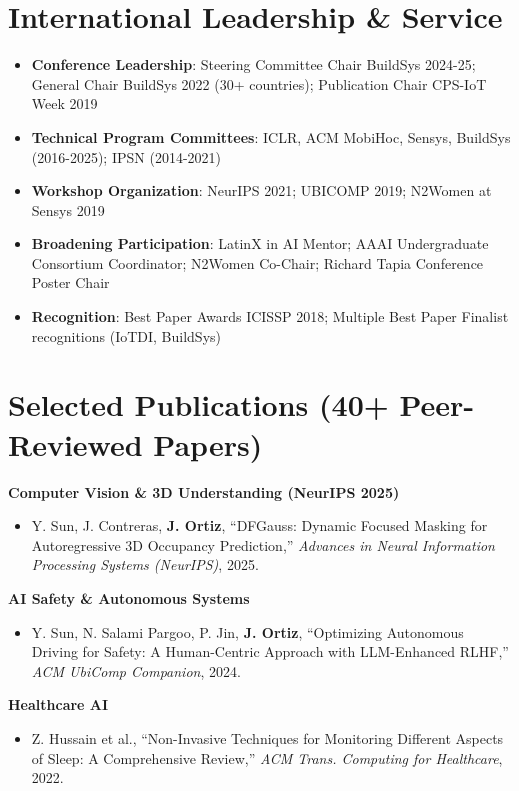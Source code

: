 \documentclass[11pt,letterpaper]{article}
\newcommand{\listentry}[1]{
    \item[\textcolor{accentBlue}{\small\faAngleRight}] #1
}
\begin{document}
\section{International Leadership \& Service}
\begin{itemize}
\listentry{\textbf{\color{UNBlue}Conference Leadership}: Steering Committee Chair BuildSys 2024-25; General Chair BuildSys 2022 (30+ countries); Publication Chair CPS-IoT Week 2019}
\listentry{\textbf{\color{UNBlue}Technical Program Committees}: ICLR, ACM MobiHoc, Sensys, BuildSys (2016-2025); IPSN (2014-2021)}
\listentry{\textbf{\color{UNBlue}Workshop Organization}: NeurIPS 2021; UBICOMP 2019; N2Women at Sensys 2019}
\listentry{\textbf{\color{UNBlue}Broadening Participation}: LatinX in AI Mentor; AAAI Undergraduate Consortium Coordinator; N2Women Co-Chair; Richard Tapia Conference Poster Chair}
\listentry{\textbf{\color{UNBlue}Recognition}: Best Paper Awards ICISSP 2018; Multiple Best Paper Finalist recognitions (IoTDI, BuildSys)}
\end{itemize}

\section{Selected Publications (40+ Peer-Reviewed Papers)}

\textbf{\color{UNBlue}Computer Vision \& 3D Understanding (NeurIPS 2025)}
\begin{itemize}[topsep=0pt]
\listentry{Y. Sun, J. Contreras, \textbf{J. Ortiz}, ``DFGauss: Dynamic Focused Masking for Autoregressive 3D Occupancy Prediction,'' \textit{Advances in Neural Information Processing Systems (NeurIPS)}, 2025.}
\end{itemize}

\textbf{\color{UNBlue}AI Safety \& Autonomous Systems}
\begin{itemize}[topsep=0pt]
\listentry{Y. Sun, N. Salami Pargoo, P. Jin, \textbf{J. Ortiz}, ``Optimizing Autonomous Driving for Safety: A Human-Centric Approach with LLM-Enhanced RLHF,'' \textit{ACM UbiComp Companion}, 2024.}
\end{itemize}

\textbf{\color{UNBlue}Healthcare AI}
\begin{itemize}[topsep=0pt]
\listentry{Z. Hussain et al., ``Non-Invasive Techniques for Monitoring Different Aspects of Sleep: A Comprehensive Review,'' \textit{ACM Trans. Computing for Healthcare}, 2022.}
\end{itemize}
\end{document}
